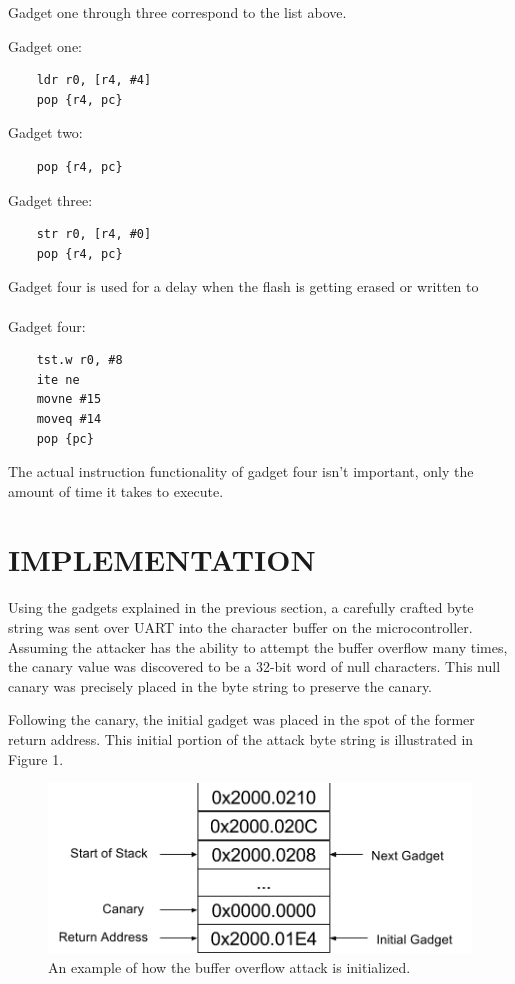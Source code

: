 \documentclass[letterpaper, 10 pt, conference]{ieeeconf}  %
\begin{document}
Gadget one through three correspond to the list above. 

Gadget one:
\begin{lstlisting}
    ldr r0, [r4, #4]
    pop {r4, pc}
\end{lstlisting}

Gadget two:
\begin{lstlisting}
    pop {r4, pc}
\end{lstlisting}

Gadget three:
\begin{lstlisting}
    str r0, [r4, #0]
    pop {r4, pc}
\end{lstlisting}

Gadget four is used for a delay when the flash is getting erased or written to
\\
\\
Gadget four:

\begin{lstlisting}
    tst.w r0, #8
    ite ne
    movne #15
    moveq #14
    pop {pc}
\end{lstlisting}

The actual instruction functionality of gadget four isn't important, only the amount of time it takes to execute.

\section{IMPLEMENTATION}

Using the gadgets explained in the previous section, a carefully crafted byte string was sent over UART into the character buffer on the microcontroller.  Assuming the attacker has the ability to attempt the buffer overflow many times, the canary value was discovered to be a 32-bit word of null characters.  This null canary was precisely placed in the byte string to preserve the canary.

Following the canary, the initial gadget was placed in the spot of the former return address.  This initial portion of the attack byte string is illustrated in Figure 1.

\begin{figure}[thpb]
	\centering
	\includegraphics[scale=.50]{TheInitialStack}
    \caption{An example of how the buffer overflow attack is initialized.}
\end{figure}
\end{document}
